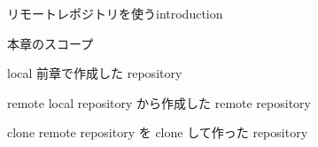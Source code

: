 
\begin{frame}[t]{リモートレポジトリを使う}{introduction}

  本章のスコープ
  \vspace{4ex}

  \begin{block}{local}
    前章で作成した repository
  \end{block}

  \begin{block}{remote}
    local repository から作成した remote repository
  \end{block}

  \begin{block}{clone}
    remote repository を clone して作った repository
  \end{block}

\end{frame}
